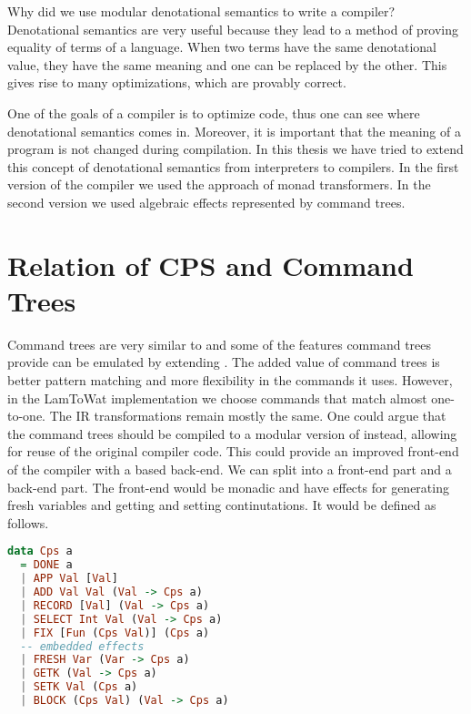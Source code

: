 Why did we use modular denotational semantics to write a compiler? Denotational semantics are very useful because they lead to a method of proving equality of terms of a language. When two terms have the same denotational value, they have the same meaning and one can be replaced by the other. This gives rise to many optimizations, which are provably correct.

One of the goals of a compiler is to optimize code, thus one can see where denotational semantics comes in. Moreover, it is important that the meaning of a program is not changed during compilation. In this thesis we have tried to extend this concept of denotational semantics from interpreters to compilers. In the first version of the compiler we used the approach of monad transformers. In the second version we used algebraic effects represented by command trees.

\section{Relation of CPS and Command Trees}
Command trees are very similar to  and some of the features command trees provide can be emulated by extending . The added value of command trees is better pattern matching and more flexibility in the commands it uses. However, in the LamToWat implementation we choose commands that match  almost one-to-one. The IR transformations remain mostly the same. One could argue that the command trees should be compiled to a modular version of  instead, allowing for reuse of the original compiler code. This could provide an improved front-end of the compiler with a  based back-end. We can split  into a front-end part and a back-end part. The front-end would be monadic and have effects for generating fresh variables and getting and setting continutations. It would be defined as follows.

\begin{lstlisting}[language=Haskell]
data Cps a
  = DONE a
  | APP Val [Val]
  | ADD Val Val (Val -> Cps a)
  | RECORD [Val] (Val -> Cps a)
  | SELECT Int Val (Val -> Cps a)
  | FIX [Fun (Cps Val)] (Cps a)
  -- embedded effects
  | FRESH Var (Var -> Cps a)
  | GETK (Val -> Cps a)
  | SETK Val (Cps a)
  | BLOCK (Cps Val) (Val -> Cps a)
\end{lstlisting}

